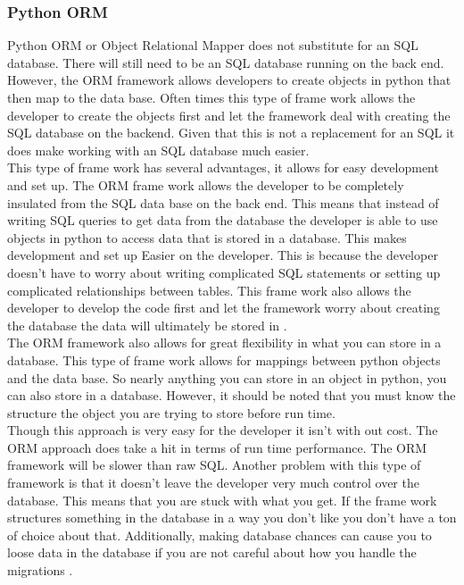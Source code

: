 \documentclass[onecolumn, draftclsnofoot,10pt, compsoc]{article}
\begin{document}
		\subsubsection{Python ORM}
				Python ORM or Object Relational Mapper does not substitute for an SQL database. There will still need to be an SQL database running on the back end. However, the ORM framework allows developers to create objects in python that then map to the data base. Often times this type of frame work allows the developer to create the objects first and let the framework deal with creating the SQL database on the backend. Given that this is not a replacement for an SQL it does make working with an SQL database much easier.\\
				This type of frame work has several advantages, it allows for easy development and set up. The ORM frame work allows the developer to be completely insulated from the SQL data base on the back end. This means that instead of writing SQL queries to get data from the database the developer is able to use objects in python to access data that is stored in a database. This makes development and set up Easier on the developer. This is because the developer doesn't have to worry about writing complicated SQL statements or setting up complicated relationships between tables. This frame work also allows the developer to develop the code first and let the framework worry about creating the database the data will ultimately be stored in \cite{IEEEexample:PythonORM}.\\
				The ORM framework also allows for great flexibility in what you can store in a database. This type of frame work allows for mappings between python objects and the data base. So nearly anything you can store in an object in python, you can also store in a database. However, it should be noted that you must know the structure the object you are trying to store before run time.\\
				Though this approach is very easy for the developer it isn't with out cost. The ORM approach does take a hit in terms of run time performance. The ORM framework will be slower than raw SQL. Another problem with this type of framework is that it doesn’t leave the developer very much control over the database. This means that you are stuck with what you get. If the frame work structures something in the database in a way you don't like you don't have a ton of choice about that. Additionally, making database chances can cause you to loose data in the database if you are not careful about how you handle the migrations \cite{IEEEexample:PythonORM}.\\
				
\end{document}
